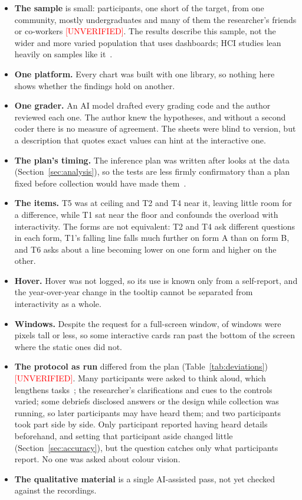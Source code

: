 \documentclass[10pt,twocolumn]{article}
\newcommand{\unverified}{\textcolor{red}{[UNVERIFIED]}}
\begin{document}
\begin{itemize}
    \item \textbf{The sample} is small:  participants, one short of the target, from one community, mostly undergraduates and many of them the researcher's friends or co-workers \unverified. The results describe this sample, not the wider and more varied population that uses dashboards; HCI studies lean heavily on samples like it~\cite{linxen2021}.
    \item \textbf{One platform.} Every chart was built with one library, so nothing here shows whether the findings hold on another.
    \item \textbf{One grader.} An AI model drafted every grading code and the author reviewed each one. The author knew the hypotheses, and without a second coder there is no measure of agreement. The sheets were blind to version, but a description that quotes exact values can hint at the interactive one.
    \item \textbf{The plan's timing.} The inference plan was written after looks at the data (Section~\ref{sec:analysis}), so the tests are less firmly confirmatory than a plan fixed before collection would have made them~\cite{cockburn2018}.
    \item \textbf{The items.} T5 was at ceiling and T2 and T4 near it, leaving little room for a difference, while T1 sat near the floor and confounds the overload with interactivity. The forms are not equivalent: T2 and T4 ask different questions in each form, T1's falling line falls much further on form A than on form B, and T6 asks about a line becoming lower on one form and higher on the other.
    \item \textbf{Hover.} Hover was not logged, so its use is known only from a self-report, and the year-over-year change in the tooltip cannot be separated from interactivity as a whole.
    \item \textbf{Windows.} Despite the request for a full-screen window,  of  windows were  pixels tall or less, so some interactive cards ran past the bottom of the screen where the static ones did not.
    \item \textbf{The protocol as run} differed from the plan (Table~\ref{tab:deviations}) \unverified. Many participants were asked to think aloud, which lengthens tasks~\cite{fox2011}; the researcher's clarifications and cues to the controls varied; some debriefs disclosed answers or the design while collection was running, so later participants may have heard them; and two participants took part side by side. Only  participant reported having heard details beforehand, and setting that participant aside changed little (Section~\ref{sec:accuracy}), but the question catches only what participants report. No one was asked about colour vision.
    \item \textbf{The qualitative material} is a single AI-assisted pass, not yet checked against the recordings.
\end{itemize}
\end{document}
